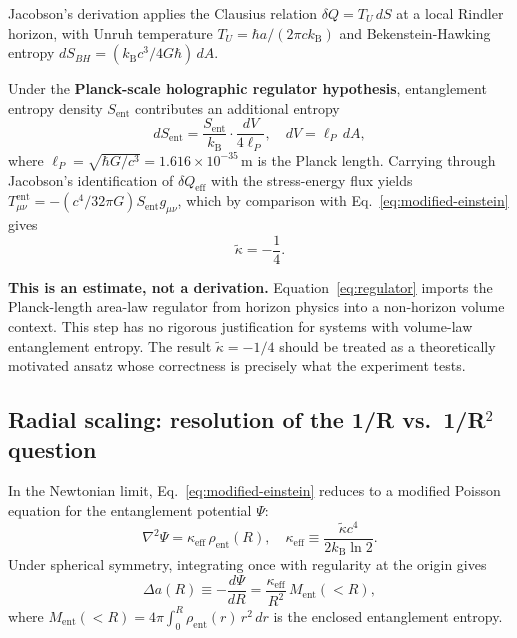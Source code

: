 \documentclass[12pt,twocolumn]{article}
\newcommand{\kB}{k_{\mathrm{B}}}
\newcommand{\lP}{\ell_{P}}
\newcommand{\kt}{\tilde{\kappa}}
\newcommand{\Sent}{S_{\mathrm{ent}}}
\newcommand{\Ment}{M_{\mathrm{ent}}}
\begin{document}
Jacobson's derivation applies the Clausius relation $\delta Q = T_U\,dS$ at a local Rindler
horizon, with Unruh temperature $T_U = \hbar a/(2\pi c\kB)$ and Bekenstein-Hawking entropy
$dS_{BH} = ({\kB c^3}/{4G\hbar})\,dA$.

Under the \textbf{Planck-scale holographic regulator hypothesis}, entanglement entropy density
$\Sent$ contributes an additional entropy
\begin{equation}
  dS_{\mathrm{ent}}
  = \frac{\Sent}{\kB}\cdot\frac{dV}{4\lP},
  \quad dV = \lP\,dA,
  \label{eq:regulator}
\end{equation}
where $\lP = \sqrt{\hbar G/c^3} = 1.616\times10^{-35}$\,m is the Planck length.
Carrying through Jacobson's identification of $\delta Q_{\mathrm{eff}}$ with the
stress-energy flux yields $T^{\mathrm{ent}}_{\mu\nu} = -(c^4/32\pi G)\Sent g_{\mu\nu}$,
which by comparison with Eq.~\eqref{eq:modified-einstein} gives
\begin{equation}
  \kt = -\frac{1}{4}.
  \label{eq:kappa}
\end{equation}

\textbf{This is an estimate, not a derivation.}  Equation~\eqref{eq:regulator} imports
the Planck-length area-law regulator from horizon physics into a non-horizon volume context.
This step has no rigorous justification for systems with volume-law entanglement entropy.
The result $\kt = -1/4$ should be treated as a theoretically motivated ansatz whose
correctness is precisely what the experiment tests.

\subsection{Radial scaling: resolution of the 1/R vs.\ 1/R$^2$ question}

In the Newtonian limit, Eq.~\eqref{eq:modified-einstein} reduces to a modified Poisson
equation for the entanglement potential $\Psi$:
\begin{equation}
  \nabla^2\Psi = \kappa_{\mathrm{eff}}\,\rho_{\mathrm{ent}}(R),
  \quad
  \kappa_{\mathrm{eff}} \equiv \frac{\kt c^4}{2\kB\ln 2}.
  \label{eq:poisson}
\end{equation}
Under spherical symmetry, integrating once with regularity at the origin gives
\begin{equation}
  \Delta a(R)
  \equiv -\frac{d\Psi}{dR}
  = \frac{\kappa_{\mathrm{eff}}}{R^2}\,\Ment(<\!R),
  \label{eq:delta-a}
\end{equation}
where $\Ment(<\!R) = 4\pi\int_0^R\rho_{\mathrm{ent}}(r)\,r^2\,dr$ is the enclosed
entanglement entropy.
\end{document}
